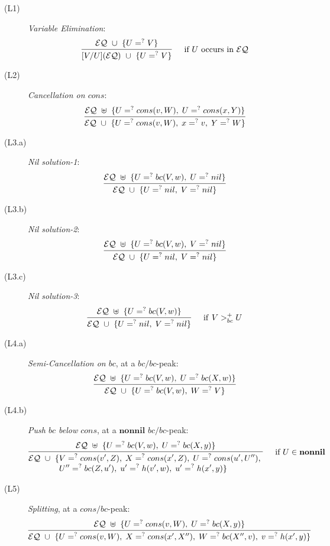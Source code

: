 \documentclass[11pt]{article}
\newcommand{\ueq}{=_{}^?}
\newcommand{\EQ}{\mathcal{EQ}}
\newcommand{\Nonnil}{\mathbf{nonnil}}
\begin{document}
\begin{description}
    \item[(L1)] {\em Variable Elimination}:
        \[\infer[\quad \text{if } U \text{ occurs in } \EQ ]
            {[V/U](\EQ) ~ \cup ~ \{U \ueq V\} }
            { \EQ ~ \cup ~ \{U \ueq V\} }
        \]

    \item[(L2)] {\em Cancellation on $cons$}:
        \[\infer
            {\EQ ~ \cup ~ \{ U \ueq cons(v, W), \; x \ueq v, \; Y \ueq W \}}
            {\EQ ~ \uplus ~ \{ U \ueq cons(v, W), \; U \ueq cons(x, Y) \}}
        \]

    \item[(L3.a)] {\em Nil solution-1}:
        \[\infer
            {\EQ ~ \cup ~ \{ U \ueq nil, \; V \ueq nil \}}
            {\EQ ~ \uplus ~ \{ U \ueq bc(V, w), \; U \ueq nil \}}
        \]

    \item[(L3.b)] {\em Nil solution-2}:
        \[\infer
            {\EQ ~ \cup ~ \{ U \ueq nil, \; V \ueq nil \}}
            {\EQ ~ \uplus ~ \{ U \ueq bc(V, w), \; V \ueq nil \}}
        \]

    \item[(L3.c)] {\em Nil solution-3}:
        \[\infer[\quad \mathrm{if} ~ V >_{bc}^{+} U ]
            {\EQ ~ \cup ~ \{ U \ueq nil, \; V \ueq nil \}}
            {\EQ ~ \uplus ~ \{ U \ueq bc(V, w) \}}
        \]

    \item[(L4.a)] {\em Semi-Cancellation on $bc$}, at a $bc/bc$-peak:
        \[\infer
            {\EQ ~ \cup ~ \{U \ueq bc(V, w), \; W \ueq V \}}
            {\EQ ~ \uplus ~ \{ U \ueq bc(V, w), \; U \ueq bc(X, w) \}}
        \]

    \item[(L4.b)] {\em Push $bc$ below $cons$}, at a $\mathbf{nonnil}$ $bc/bc$-peak:
        \[\infer[\quad \text{if } U \in \Nonnil]
            {\begin{aligned}
                \EQ ~ \cup ~ \{
                & V \ueq cons(v', Z), \; X \ueq cons(x', Z), \;
                  U \ueq cons(u', U''), \; \\[-4pt]
                & U'' \ueq bc(Z, u'), \; u' \ueq h(v', w), \; u' \ueq h(x', y) \}
            \end{aligned}}
            {\EQ ~ \uplus ~ \{ U \ueq bc(V, w), \; U \ueq bc(X, y) \}}
        \]

    \item[(L5)] {\em Splitting}, at a $cons/bc$-peak:
        \[\infer
            {\EQ ~ \cup ~ \{ U \ueq cons(v, W) , \; X \ueq cons(x', X''), \;
                             W \ueq bc(X'', v), \; v \ueq h(x', y) \}}
            {\EQ ~ \uplus ~ \{ U \ueq cons(v, W), \;
                               U \ueq bc(X, y) \}}
        \]


\end{description}
\end{document}

